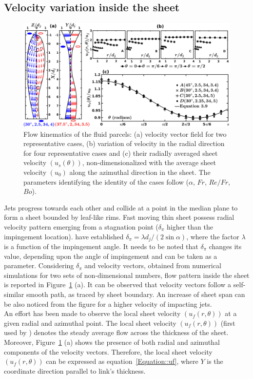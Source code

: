\subsection{Velocity variation inside the sheet}
\begin{figure}
	\centering
	\includegraphics[width=\linewidth]{chapters/jetJet/Figure5}
	\caption{Flow kinematics of the fluid parcels: (a) velocity vector field for two representative cases, (b) variation of velocity in the radial direction for four representative cases and (c) their radially averaged sheet velocity $\left(u_s(\theta)\right)$, non-dimensionalized with the average sheet velocity $\left(u_0\right)$ along the azimuthal direction in the sheet. The parameters identifying the identity of the cases follow ($\alpha$, $Fr$, $Re/Fr$, $Bo$).}
	\label{Figure::velocityVectors}
\end{figure}
Jets progress towards each other and collide at a point in the median plane to form a sheet bounded by leaf-like rims. Fast moving thin sheet possess radial velocity pattern emerging from a stagnation point ($\delta_\pi$ higher than the impingement location). \citet{inamura2014effect} have established $\delta_\pi = \lambda d_j/(2\sin\alpha)$, where the factor $\lambda$ is a function of the impingement angle. It needs to be noted that $\delta_\pi$ changes its value, depending upon the angle of impingement and can be taken as a parameter. Considering $\delta_\pi$ and velocity vectors, obtained from numerical simulations for two sets of non-dimensional numbers, flow pattern inside the sheet is reported in Figure~\ref{Figure::velocityVectors} (a). It can be observed that velocity vectors follow a self-similar smooth path, as traced by sheet boundary. An increase of sheet span can be also noticed from the figure for a higher velocity of impacting jets.\\
An effort has been made to observe the local sheet velocity $\left(u_f(r,\theta)\right)$ at a given radial and azimuthal point. The local sheet velocity $\left(u_f(r,\theta)\right)$ (first used by \citet{choo2002velocity}) denotes the steady average flow across the thickness of the sheet. Moreover, Figure~\ref{Figure::velocityVectors} (a) shows the presence of both radial and azimuthal components of the velocity vectors. Therefore, the local sheet velocity $\left(u_f(r,\theta)\right)$ can be expressed as equation~\ref{Equation::uf}, where $Y$ is the coordinate direction parallel to link's thickness.

